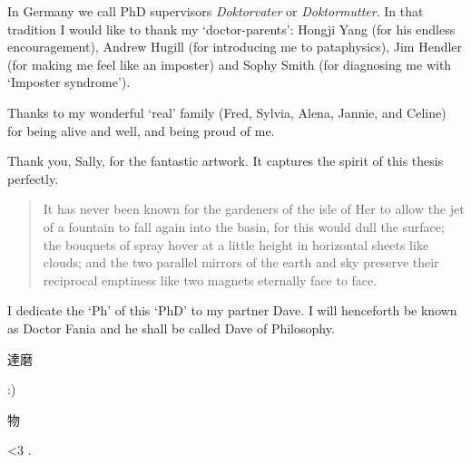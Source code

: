 
\pagestyle{fania}

\begin{wrapfigure}{L}{0.2\textwidth}
\end{wrapfigure}


In Germany we call PhD supervisors \textit{Doktorvater} or \textit{Doktormutter}. In that tradition I would like to thank my `doctor-parents': Hongji Yang (for his endless encouragement), Andrew Hugill (for introducing me to pataphysics), Jim Hendler (for making me feel like an imposter) and Sophy Smith (for diagnosing me with `Imposter syndrome').

Thanks to my wonderful `real' family (Fred, Sylvia, Alena, Jannie, and Celine) for being alive and well, and being proud of me.

Thank you, Sally, for the fantastic artwork. It captures the spirit of this thesis perfectly.


\spirals


\begin{quotation}
  It has never been known for the gardeners of the isle of Her to allow the jet of a fountain to fall again into the basin, for this would dull the surface; the bouquets of spray hover at a little height in horizontal sheets like clouds; and the two parallel mirrors of the earth and sky preserve their reciprocal emptiness like two magnets eternally face to face. 
\end{quotation}


\spirals


I dedicate the `Ph' of this `PhD' to my partner Dave. I will henceforth be known as Doctor Fania and he shall be called Dave of Philosophy. 

\hspace{0cm}\textipa{[rI"mEmb@ Ti:]} \begin{CJK}{UTF8}{min}達磨\end{CJK} :) \textipa{["h\ae pi} \begin{CJK}{UTF8}{min}物\end{CJK} \textipa{"v3:s@ri]} <3 . 


